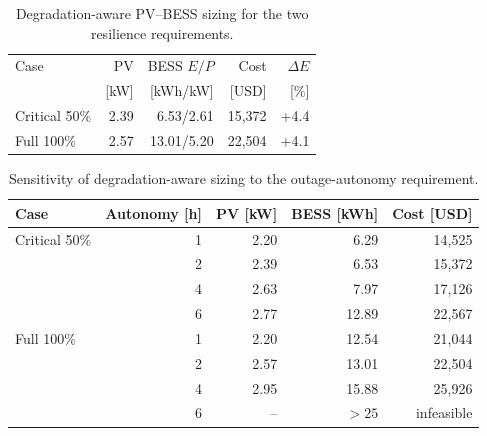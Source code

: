 
\begin{table}[t]
\centering
\small
\caption{Degradation-aware PV--BESS sizing for the two resilience requirements.}
\label{tab:sizing}
\begin{tabular}{lrrrr}
\toprule
Case & PV & BESS $E/P$ & Cost & $\Delta E$ \\
 & [kW] & [kWh/kW] & [USD] & [\%] \\
\midrule
Critical 50\% & 2.39 & 6.53/2.61 & 15,372 & +4.4 \\
Full 100\% & 2.57 & 13.01/5.20 & 22,504 & +4.1 \\
\bottomrule
\end{tabular}
\par\vspace{1mm}{\footnotesize $\Delta E$ is the BESS-capacity increase relative to sizing without degradation.}
\end{table}

\begin{table}[t]
\centering
\small
\caption{Sensitivity of degradation-aware sizing to the outage-autonomy requirement.}
\label{tab:autonomy}
\begin{tabular}{lrrrr}
\toprule
Case & Autonomy [h] & PV [kW] & BESS [kWh] & Cost [USD] \\
\midrule
Critical 50\% & 1 & 2.20 & 6.29 & 14,525 \\
 & 2 & 2.39 & 6.53 & 15,372 \\
 & 4 & 2.63 & 7.97 & 17,126 \\
 & 6 & 2.77 & 12.89 & 22,567 \\
Full 100\% & 1 & 2.20 & 12.54 & 21,044 \\
 & 2 & 2.57 & 13.01 & 22,504 \\
 & 4 & 2.95 & 15.88 & 25,926 \\
 & 6 & -- & $>25$ & infeasible \\
\bottomrule
\end{tabular}
\par\vspace{1mm}{\footnotesize The 6-h full-service design is infeasible under the 25-kWh cap; an expanded-bound solve certified a minimum of 25.63 kWh.}
\end{table}

